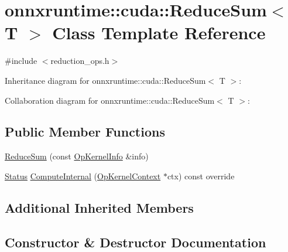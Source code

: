 \hypertarget{classonnxruntime_1_1cuda_1_1ReduceSum}{}\section{onnxruntime\+:\+:cuda\+:\+:Reduce\+Sum$<$ T $>$ Class Template Reference}
\label{classonnxruntime_1_1cuda_1_1ReduceSum}


{\ttfamily \#include $<$reduction\+\_\+ops.\+h$>$}



Inheritance diagram for onnxruntime\+:\+:cuda\+:\+:Reduce\+Sum$<$ T $>$\+:


Collaboration diagram for onnxruntime\+:\+:cuda\+:\+:Reduce\+Sum$<$ T $>$\+:
\subsection*{Public Member Functions}
\begin{DoxyCompactItemize}
\item 
\mbox{\hyperlink{classonnxruntime_1_1cuda_1_1ReduceSum_a29bfe48f2922f9904e50b1add04bd3fe}{Reduce\+Sum}} (const \mbox{\hyperlink{classonnxruntime_1_1OpKernelInfo}{Op\+Kernel\+Info}} \&info)
\item 
\mbox{\hyperlink{classonnxruntime_1_1common_1_1Status}{Status}} \mbox{\hyperlink{classonnxruntime_1_1cuda_1_1ReduceSum_a4921d463701f4ad89256532b402e77ca}{Compute\+Internal}} (\mbox{\hyperlink{classonnxruntime_1_1OpKernelContext}{Op\+Kernel\+Context}} $\ast$ctx) const override
\end{DoxyCompactItemize}
\subsection*{Additional Inherited Members}


\subsection{Constructor \& Destructor Documentation}
\mbox{\label{classonnxruntime_1_1cuda_1_1ReduceSum_a29bfe48f2922f9904e50b1add04bd3fe}} 
